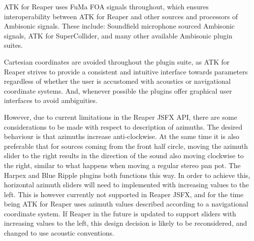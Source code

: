 \documentclass{article}
\begin{document}

ATK for Reaper uses FuMa FOA signals throughout, which ensures interoperability between ATK for Reaper and other sources and processors of Ambisonic signals. These include: Soundfield microphone sourced Ambisonic signals, ATK for SuperCollider, and many other available Ambisonic plugin suites.


Cartesian coordinates are avoided throughout the plugin suite, as ATK for Reaper strives to provide a consistent and intuitive interface towards parameters regardless of whether the user is accustomed with acoustics or navigational coordinate systems. And, whenever possible the plugins offer graphical user interfaces to avoid ambiguities.

However, due to current limitations in the Reaper JSFX API, there are some considerations to be made with respect to description of azimuths.
The desired behaviour is that azimuths increase anti-clockwise.
At the same time it is also preferable that for sources coming from the front half circle, moving the azimuth slider to the right results in the direction of the sound also moving clockwise to the right, similar to what happens when moving a regular stereo pan pot.
The Harpex and Blue Ripple plugins both functions this way.
In order to achieve this, horizontal azimuth sliders will need to implemented with increasing values to the left.
This is however currently not supported in Reaper JSFX, and for the time being ATK for Reaper uses azimuth values described according to a navigational coordinate system.
If Reaper in the future is updated to support sliders with increasing values to the left, this design decision is likely to be reconsidered, and changed to use acoustic conventions.
\end{document}
